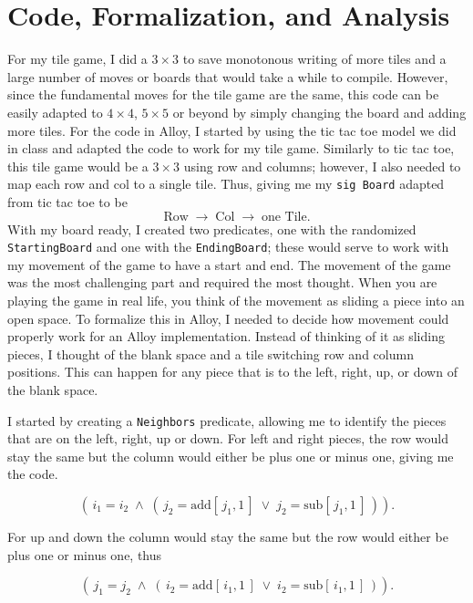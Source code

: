 \documentclass[12pt]{article}
\theoremstyle{definition} \newtheorem{prob}{Problem}
\theoremstyle{definition} \newtheorem{cprob}{Challenge Problem}
\theoremstyle{definition} \newtheorem{sol}{Solution}
\begin{document}
\section{Code, Formalization, and Analysis}
For my tile game, I did a $3\times 3$ to save monotonous writing of more tiles and a large number of moves or boards that would take a while to compile. However, since the fundamental moves for the tile game are the same, this code can be easily adapted to $4\times 4$, $5\times 5$ or beyond by simply changing the board and adding more tiles. For the code in Alloy, I started by using the tic tac toe model we did in class and adapted the code to work for my tile game. Similarly to tic tac toe, this tile game would be a $3\times 3$ using row and columns; however, I also needed to map each row and col to a single tile. Thus, giving me my \texttt{sig Board} adapted from tic tac toe to be
\[
  \mathrm{Row} \;\to\; \mathrm{Col} \;\to\; \text{one Tile}.
\]
With my board ready, I created two predicates, one with the randomized \texttt{StartingBoard} and one with the \texttt{EndingBoard}; these would serve to work with my movement of the game to have a start and end. The movement of the game was the most challenging part and required the most thought. When you are playing the game in real life, you think of the movement as sliding a piece into an open space. To formalize this in Alloy, I needed to decide how movement could properly work for an Alloy implementation. Instead of thinking of it as sliding pieces, I thought of the blank space and a tile switching row and column positions. This can happen for any piece that is to the left, right, up, or down of the blank space.

I started by creating a \texttt{Neighbors} predicate, allowing me to identify the pieces that are on the left, right, up or down. For left and right pieces, the row would stay the same but the column would either be plus one or minus one, giving me the code.

\[
  (\,i_1 = i_2 \;\wedge\; (\,j_2 = \mathrm{add}[\,j_1,1\,]\;\vee\; j_2 = \mathrm{sub}[\,j_1,1\,]\,)).
\]

For up and down the column would stay the same but the row would either be plus one or minus one, thus

\[
  (\,j_1 = j_2 \;\wedge\; (\,i_2 = \mathrm{add}[\,i_1,1\,]\;\vee\; i_2 = \mathrm{sub}[\,i_1,1\,]\,)).
\]
\end{document}
